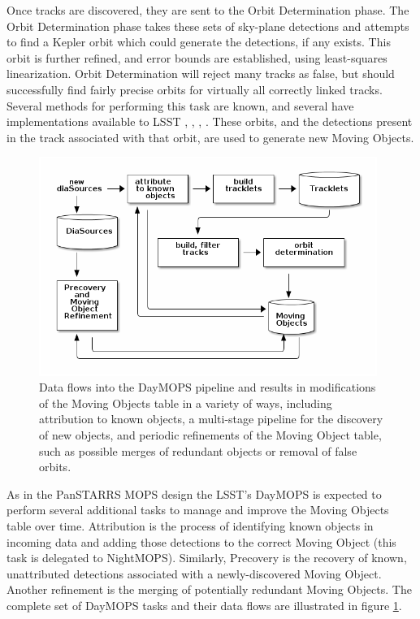 \documentclass[12pt,preprint]{aastex}
\begin{document}
Once tracks are discovered, they are sent to the Orbit Determination
phase. The Orbit Determination phase takes these sets of sky-plane
detections and attempts to find a Kepler orbit which could generate
the detections, if any exists.  This orbit is further refined, and
error bounds are established, using least-squares linearization.
Orbit Determination will reject many tracks as false, but should
successfully find fairly precise orbits for virtually all correctly
linked tracks.  Several methods for performing this task are known,
and several have implementations available to LSST
\citep{Milani04orbitdetermination}, \citep{Milani2006},
\citep{OpenOrb2009}, \citep{granvik_thesis}.  These orbits, and the
detections present in the track associated with that orbit, are used
to generate new Moving Objects.

\begin{figure}[h]
\begin{center}
  \includegraphics[width=11cm]{illustrations/mopsDiagram.png}
\end{center}
\caption{ Data flows into the DayMOPS pipeline and results in
  modifications of the Moving Objects table in a variety of ways,
  including attribution to known objects, a multi-stage pipeline for
  the discovery of new objects, and periodic refinements of the Moving
  Object table, such as possible merges of redundant objects or
  removal of false orbits. }
\label{mopsDiagram}
\end{figure}



As in the PanSTARRS MOPS design \citep{psMOPSDesign} the LSST's
DayMOPS is expected to perform several additional tasks to manage and
improve the Moving Objects table over time.  Attribution is the
process of identifying known objects in incoming data and adding those
detections to the correct Moving Object (this task is delegated to
NightMOPS). Similarly, Precovery is the recovery of known,
unattributed detections associated with a newly-discovered Moving
Object.  Another refinement is the merging of potentially redundant
Moving Objects.  The complete set of DayMOPS tasks and their data
flows are illustrated in figure \ref{mopsDiagram}.
\end{document}
